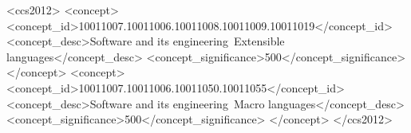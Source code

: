 \documentclass[acmsmall]{acmart}
\begin{document}
\begin{abstract}


\end{abstract}


\begin{CCSXML}
<ccs2012>
<concept>
<concept_id>10011007.10011006.10011008.10011009.10011019</concept_id>
<concept_desc>Software and its engineering~Extensible languages</concept_desc>
<concept_significance>500</concept_significance>
</concept>
<concept>
<concept_id>10011007.10011006.10011050.10011055</concept_id>
<concept_desc>Software and its engineering~Macro languages</concept_desc>
<concept_significance>500</concept_significance>
</concept>
</ccs2012>
\end{CCSXML}





\maketitle
\end{document}
